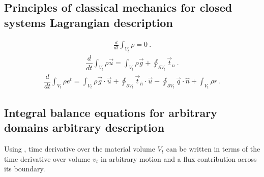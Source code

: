 \documentclass[letterpaper,10pt,english]{jupyterBook}
\begin{document}
\subsection{Principles of classical mechanics for closed systems \sphinxhyphen{} Lagrangian description}
\label{\detokenize{ch/continuum/balance-primary-integral:principles-of-classical-mechanics-for-closed-systems-lagrangian-description}}\label{\detokenize{ch/continuum/balance-primary-integral:continuum-governing-equations-primary-integral-lagrange}}
\sphinxAtStartPar
{}
\begin{equation*}
\begin{split}\frac{d}{dt} \int_{V_t} \rho = 0 \ .\end{split}
\end{equation*}
\sphinxAtStartPar
{}
\begin{equation*}
\begin{split}\dfrac{d}{dt} \int_{V_t} \rho \vec{u} = \int_{V_t} \rho \vec{g} + \oint_{\partial V_t} \vec{t}_{\hat{n}} \ .\end{split}
\end{equation*}
\sphinxAtStartPar
{}
\begin{equation*}
\begin{split}\dfrac{d}{dt} \int_{V_t} \rho e^t = \int_{V_t} \rho \vec{g} \cdot \vec{u} + \oint_{\partial V_t} \vec{t}_{\hat{n}} \cdot \vec{u} - \oint_{\partial V_t} \vec{q} \cdot \hat{n} + \int_{V_t} \rho r \ .\end{split}
\end{equation*}

\subsection{Integral balance equations for arbitrary domains \sphinxhyphen{} arbitrary description}
\label{\detokenize{ch/continuum/balance-primary-integral:integral-balance-equations-for-arbitrary-domains-arbitrary-description}}\label{\detokenize{ch/continuum/balance-primary-integral:continuum-governing-equations-primary-integral-arbitrary}}
\sphinxAtStartPar
Using , time derivative over the material volume \(V_t\) can be written in terms of the time derivative over volume \(v_t\) in arbitrary motion and a flux contribution across its boundary.
\end{document}
